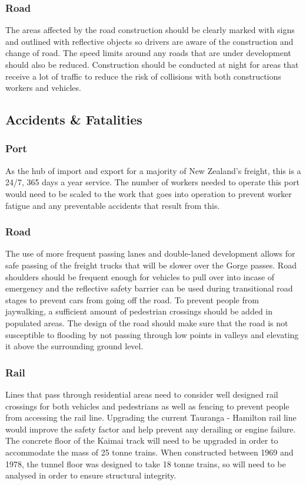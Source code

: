 \begin{multicols}{2}
    \subsubsection*{Road}
        The areas affected by the road construction should be clearly marked with signs and outlined with reflective objects so drivers are aware of the construction and change of road. The speed limits around any roads that are under development should also be reduced. Construction should be conducted at night for areas that receive a lot of traffic to reduce the risk of collisions with both constructions workers and vehicles.

\subsection*{Accidents \& Fatalities}
    \subsubsection*{Port}
        As the hub of import and export for a majority of New Zealand’s freight, this is a 24/7, 365 days a year service. The number of workers needed to operate this port would need to be scaled to the work that goes into operation to prevent worker fatigue and any preventable accidents that result from this.
    \subsubsection*{Road}
        The use of more frequent passing lanes and double-laned development allows for safe  passing of the freight trucks that will be slower over the Gorge passes. Road shoulders should be frequent enough for vehicles to pull over into incase of emergency and the reflective safety barrier can be used during transitional road stages to prevent cars from going off the road. To prevent people from jaywalking, a sufficient amount of pedestrian crossings should be added in populated areas. The design of the road should make sure that the road is not susceptible to flooding by not passing through low points in valleys and elevating it above the surrounding ground level.
    \subsubsection*{Rail}
        Lines that pass through residential areas need to consider well designed rail crossings for both vehicles and pedestrians as well as fencing to prevent people from accessing the rail line. Upgrading the current Tauranga - Hamilton rail line would improve the safety factor and help prevent any derailing or engine failure. The concrete floor of the Kaimai track will need to be upgraded in order to accommodate the mass of 25 tonne trains. When constructed between 1969 and 1978, the tunnel floor was designed to take 18 tonne trains, so will need to be analysed in order to ensure structural integrity.

\end{multicols}
\clearpage